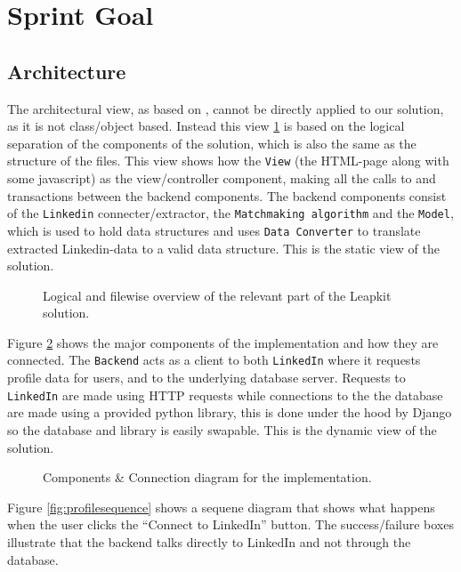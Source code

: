 \section{Sprint Goal}


\subsection{Architecture}

The architectural view, as based on \cite{christensen20123+}, cannot be directly applied to our solution, as it is not class/object based. Instead this view \ref{fig:overview} is based on the logical separation of the components of the solution, which is also the same as the structure of the files. This view shows how the \texttt{View} (the HTML-page along with some javascript) as the view/controller component, making all the calls to and transactions between the backend components. The backend components consist of the \texttt{Linkedin} connecter/extractor, the \texttt{Matchmaking algorithm} and the \texttt{Model}, which is used to hold data structures and uses \texttt{Data Converter} to translate extracted Linkedin-data to a valid data structure. This is the static view of the solution.

\begin{figure}[ht]
    \centering
    \scalebox{1}{}
    \caption{Logical and filewise overview of the relevant part of the Leapkit solution.}
    \label{fig:overview}
\end{figure}

Figure \ref{fig:ccdiagram} shows the major components of the implementation and how they are connected. The \texttt{Backend} acts as a client to both \texttt{LinkedIn} where it requests profile data for users, and to the underlying database server. Requests to \texttt{LinkedIn} are made using HTTP requests while connections to the the database are made using a provided python library, this is done under the hood by Django so the database and library is easily swapable. This is the dynamic view of the solution.

\begin{figure}[ht]
    \centering
    \scalebox{1}{}
    \caption{Components \& Connection diagram for the implementation.}
    \label{fig:ccdiagram}
\end{figure}

Figure \ref{fig:profilesequence} shows a sequene diagram that shows what happens when the user clicks the ``Connect to LinkedIn'' button. The success/failure boxes illustrate that the backend talks directly to LinkedIn and not through the database.

